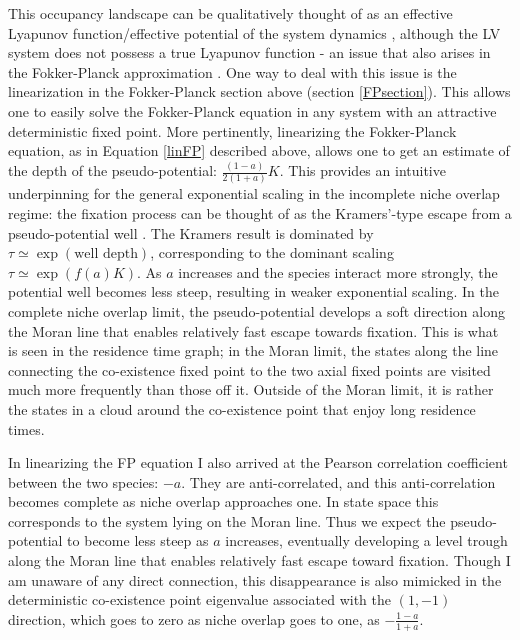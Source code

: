 This occupancy landscape can be qualitatively thought of as an effective Lyapunov function/effective potential of the system dynamics \cite{Zhou2012}, although the LV system does not possess a true Lyapunov function - an issue that also arises in the Fokker-Planck approximation \cite{Zhou2012,Chotibut2015}. 
One way to deal with this issue is the linearization in the Fokker-Planck section above (section \ref{FPsection}). 
This allows one to easily solve the Fokker-Planck equation in any system with an attractive deterministic fixed point. 
More pertinently, linearizing the Fokker-Planck equation, as in Equation \ref{linFP} described above, allows one to get an estimate of the depth of the pseudo-potential: $\frac{(1-a)}{2(1+a)}K$. 
This provides an intuitive underpinning for the general exponential scaling in the incomplete niche overlap regime: the fixation process can be thought of as the Kramers'-type escape from a pseudo-potential well \cite{Berglund2011}. 
The Kramers result is dominated by $\tau \simeq \exp(\text{well depth})$, corresponding to the dominant scaling $\tau \simeq \exp(f(a)K)$. 
As $a$ increases and the species interact more strongly, the potential well becomes less steep, resulting in weaker exponential scaling. 
In the complete niche overlap limit, the pseudo-potential develops a soft direction along the Moran line that enables relatively fast escape towards fixation.
This is what is seen in the residence time graph; in the Moran limit, the states along the line connecting the co-existence fixed point to the two axial fixed points are visited much more frequently than those off it. Outside of the Moran limit, it is rather the states in a cloud around the co-existence point that enjoy long residence times. 

In linearizing the FP equation I also arrived at the Pearson correlation coefficient between the two species: $-a$. 
They are anti-correlated, and this anti-correlation becomes complete as niche overlap approaches one. 
In state space this corresponds to the system lying on the Moran line. 
Thus we expect the pseudo-potential to become less steep as $a$ increases, eventually developing a level trough along the Moran line that enables relatively fast escape toward fixation. 
Though I am unaware of any direct connection, this disappearance is also mimicked in the deterministic co-existence point eigenvalue associated with the $(1,-1)$ direction, which goes to zero as niche overlap goes to one, as $-\frac{1-a}{1+a}$. %


